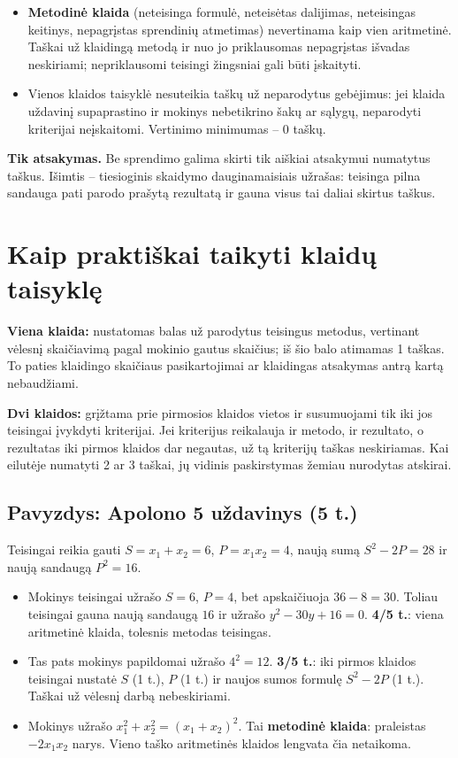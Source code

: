 \documentclass[11pt,a4paper]{article}
\begin{document}
\begin{itemize}
\item \textbf{Metodinė klaida} (neteisinga formulė, neteisėtas dalijimas, neteisingas keitinys, nepagrįstas sprendinių atmetimas) nevertinama kaip vien aritmetinė. Taškai už klaidingą metodą ir nuo jo priklausomas nepagrįstas išvadas neskiriami; nepriklausomi teisingi žingsniai gali būti įskaityti.
\item Vienos klaidos taisyklė nesuteikia taškų už neparodytus gebėjimus: jei klaida uždavinį supaprastino ir mokinys nebetikrino šakų ar sąlygų, neparodyti kriterijai neįskaitomi. Vertinimo minimumas -- 0 taškų.
\end{itemize}

\textbf{Tik atsakymas.} Be sprendimo galima skirti tik aiškiai atsakymui numatytus taškus. Išimtis -- tiesioginis skaidymo dauginamaisiais užrašas: teisinga pilna sandauga pati parodo prašytą rezultatą ir gauna visus tai daliai skirtus taškus.

\newpage
\section*{Kaip praktiškai taikyti klaidų taisyklę}
\textbf{Viena klaida:} nustatomas balas už parodytus teisingus metodus, vertinant vėlesnį skaičiavimą pagal mokinio gautus skaičius; iš šio balo atimamas 1 taškas. To paties klaidingo skaičiaus pasikartojimai ar klaidingas atsakymas antrą kartą nebaudžiami.

\textbf{Dvi klaidos:} grįžtama prie pirmosios klaidos vietos ir susumuojami tik iki jos teisingai įvykdyti kriterijai. Jei kriterijus reikalauja ir metodo, ir rezultato, o rezultatas iki pirmos klaidos dar negautas, už tą kriterijų taškas neskiriamas. Kai eilutėje numatyti 2 ar 3 taškai, jų vidinis paskirstymas žemiau nurodytas atskirai.

\subsection*{Pavyzdys: Apolono 5 uždavinys (5 t.)}
Teisingai reikia gauti $S=x_1+x_2=6$, $P=x_1x_2=4$, naują sumą $S^2-2P=28$ ir naują sandaugą $P^2=16$.
\begin{itemize}
\item Mokinys teisingai užrašo $S=6$, $P=4$, bet apskaičiuoja $36-8=30$. Toliau teisingai gauna naują sandaugą $16$ ir užrašo $y^2-30y+16=0$. \textbf{4/5 t.}: viena aritmetinė klaida, tolesnis metodas teisingas.
\item Tas pats mokinys papildomai užrašo $4^2=12$. \textbf{3/5 t.}: iki pirmos klaidos teisingai nustatė $S$ (1 t.), $P$ (1 t.) ir naujos sumos formulę $S^2-2P$ (1 t.). Taškai už vėlesnį darbą nebeskiriami.
\item Mokinys užrašo $x_1^2+x_2^2=(x_1+x_2)^2$. Tai \textbf{metodinė klaida}: praleistas $-2x_1x_2$ narys. Vieno taško aritmetinės klaidos lengvata čia netaikoma.
\end{itemize}
\end{document}
